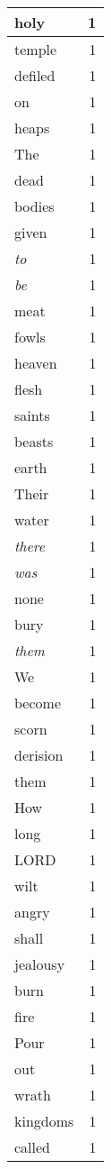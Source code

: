 \begin{center}
\begin{longtable}{l|r}
holy & 1 \\ \hline
temple & 1 \\ \hline
defiled & 1 \\ \hline
on & 1 \\ \hline
heaps & 1 \\ \hline
The & 1 \\ \hline
dead & 1 \\ \hline
bodies & 1 \\ \hline
given & 1 \\ \hline
\emph{to} & 1 \\ \hline
\emph{be} & 1 \\ \hline
meat & 1 \\ \hline
fowls & 1 \\ \hline
heaven & 1 \\ \hline
flesh & 1 \\ \hline
saints & 1 \\ \hline
beasts & 1 \\ \hline
earth & 1 \\ \hline
Their & 1 \\ \hline
water & 1 \\ \hline
\emph{there} & 1 \\ \hline
\emph{was} & 1 \\ \hline
none & 1 \\ \hline
bury & 1 \\ \hline
\emph{them} & 1 \\ \hline
We & 1 \\ \hline
become & 1 \\ \hline
scorn & 1 \\ \hline
derision & 1 \\ \hline
them & 1 \\ \hline
How & 1 \\ \hline
long & 1 \\ \hline
LORD & 1 \\ \hline
wilt & 1 \\ \hline
angry & 1 \\ \hline
shall & 1 \\ \hline
jealousy & 1 \\ \hline
burn & 1 \\ \hline
fire & 1 \\ \hline
Pour & 1 \\ \hline
out & 1 \\ \hline
wrath & 1 \\ \hline
kingdoms & 1 \\ \hline
called & 1 \\ \hline

\end{longtable}
\end{center}
